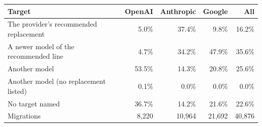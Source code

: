 \begin{tabular}{lrrrr}
\toprule
Target & OpenAI & Anthropic & Google & All \\
\midrule
The provider's recommended replacement & 5.0\% & 37.4\% & 9.8\% & 16.2\% \\
A newer model of the recommended line & 4.7\% & 34.2\% & 47.9\% & 35.6\% \\
Another model & 53.5\% & 14.3\% & 20.8\% & 25.6\% \\
Another model (no replacement listed) & 0.1\% & 0.0\% & 0.0\% & 0.0\% \\
No target named & 36.7\% & 14.2\% & 21.6\% & 22.6\% \\
\midrule
Migrations & 8,220 & 10,964 & 21,692 & 40,876 \\
\bottomrule
\end{tabular}
